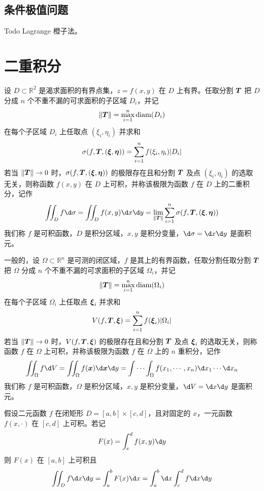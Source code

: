 \subsection{条件极值问题}

Todo Lagrange 橙子法。

\section{二重积分}

\begin{definition}
	设 $D \subset \mathbb{R}^2$ 是渴求面积的有界点集，$z = f(x, y)$ 在 $D$ 上有界。任取分割 $\boldsymbol{T}$ 把 $D$ 分成 $n$ 个不重不漏的可求面积的子区域 $D_i$，并记
	\[ \| \boldsymbol{T} \| = \max_{i=1}^n \operatorname{diam}(D_i) \]
	在每个子区域 $D_i$ 上任取点 $(\xi_i, \eta_i)$ 并求和
	\[ \sigma(f, \boldsymbol{T}, (\boldsymbol{\xi}, \boldsymbol{\eta})) = \sum_{i=1}^n f(\xi_i, \eta_i) |D_i| \]
	若当 $\|\boldsymbol{T}\| \to 0$ 时，$\sigma(f, \boldsymbol{T}, (\boldsymbol{\xi}, \boldsymbol{\eta}))$ 的极限存在且和分割 $\boldsymbol{T}$ 及点 $(\xi_i, \eta_i)$ 的选取无关，则称函数 $f(x, y)$ 在 $D$ 上可积，并称该极限为函数 $f$ 在 $D$ 上的二重积分，记作
	\[ \iint_{D} f \d \sigma = \iint_{D} f(x, y) \d x \d y = \lim_{\| \vbf{T} \|} \sum_{i=1}^n \sigma(f, \vbf{T}, (\vbf{\xi}, \vbf{\eta})) \]
	我们称 $f$ 是可积函数，$D$ 是积分区域，$x, y$ 是积分变量，$\d \sigma = \d x \d y$ 是面积元。
\end{definition}

一般的，设 $\Omega \subset \mathbb{R}^n$ 是可测的闭区域，$f$ 是其上的有界函数，任取分割任取分割 $\boldsymbol{T}$ 把 $\Omega$ 分成 $n$ 个不重不漏的可求面积的子区域 $\Omega_i$，并记
\[ \| \boldsymbol{T} \| = \max_{i=1}^n \operatorname{diam}(\Omega_i) \]
在每个子区域 $\Omega_i$ 上任取点 $\boldsymbol{\xi}_i$ 并求和
\[ V(f, \boldsymbol{T}, \boldsymbol{\xi}) = \sum_{i=1}^n f(\boldsymbol{\xi}_i) |\Omega_i| \]
若当 $\|\boldsymbol{T}\| \to 0$ 时，$V(f, \boldsymbol{T}, \boldsymbol{\xi})$ 的极限存在且和分割 $\boldsymbol{T}$ 及点 $\boldsymbol{\xi}_i$ 的选取无关，则称函数 $f$ 在 $\Omega$ 上可积，并称该极限为函数 $f$ 在 $\Omega$ 上的 $n$ 重积分，记作
\[ \iint_{\Omega} f \d V = \iint_{\Omega} f(\vbf{x}) \d \vbf{x} \d y = \int \cdots \int_{\Omega} f(x_1, \cdots, x_n) \d x_1 \cdots \d x_n \]
我们称 $f$ 是可积函数，$\Omega$ 是积分区域，$x, y$ 是积分变量，$\d V = \d x \d y$ 是面积元。

\begin{definition}[Fubini 定理]
	假设二元函数 $f$ 在闭矩形 $D = [a, b] \times [c, d]$，且对固定的 $x$，一元函数 $f(x, \cdot)$ 在 $[c, d]$ 上可积。若记
	\[ F(x) = \int_c^d f(x, y) \d y \]
	则 $F(x)$ 在 $[a, b]$ 上可积且
	\[ \iint_{D} f \d x \d y = \int_{a}^{b} F(x) \d x = \int_{a}^{b} \d x \int_{c}^{d} f \d x \d y \]
\end{definition}

